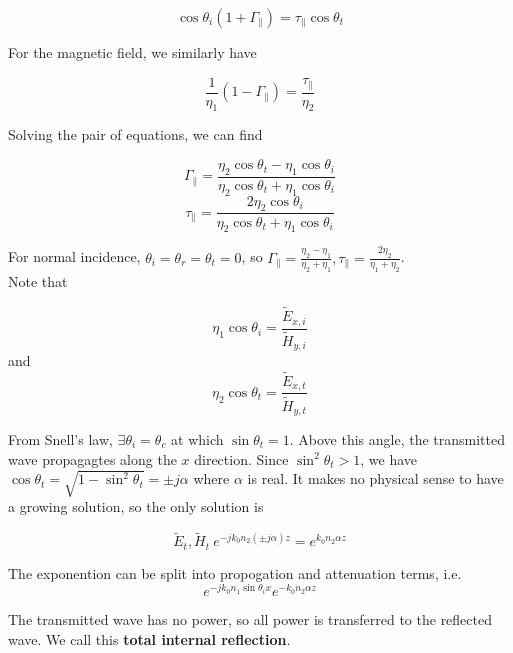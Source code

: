 \documentclass[12pt]{article}
\begin{document}
$$\cos\theta_i(1 + \Gamma_\parallel) = \tau_\parallel \cos\theta_t$$

For the magnetic field, we similarly have

$$\frac{1}{\eta_1}(1 - \Gamma_\parallel) = \frac{\tau_\parallel}{\eta_2}$$

Solving the pair of equations, we can find

$$\Gamma_\parallel = \frac{\eta_2\cos\theta_t - \eta_1\cos\theta_i}{\eta_2\cos\theta_t + \eta_1\cos\theta_i}$$
$$\tau_\parallel = \frac{2\eta_2\cos\theta_i}{\eta_2\cos\theta_t + \eta_1\cos\theta_i}$$

For normal incidence, $\theta_i = \theta_r = \theta_t = 0$, so $\Gamma_\parallel = \frac{\eta_2 - \eta_1}{\eta_2 + \eta_1}, \tau_\parallel = \frac{2\eta_2}{\eta_1 + \eta_2}$. \\

Note that

$$\eta_1\cos\theta_i = \frac{\tilde E_{x,i}}{\tilde H_{y,i}}$$
and
$$\eta_2\cos\theta_t = \frac{\tilde E_{x,t}}{\tilde H_{y,t}}$$

From Snell's law, $\exists \theta_i = \theta_c$ at which $\sin\theta_t = 1$. Above this angle, the transmitted wave propagagtes along the $x$ direction. Since $\sin^2\theta_t > 1$, we have $\cos\theta_t = \sqrt{1 - \sin^2\theta_t} = \pm j\alpha$ where $\alpha$ is real. It makes no physical sense to have a growing solution, so the only solution is

$$\tilde E_t, \tilde H_t ~ e^{-jk_0n_2(\pm j\alpha)z} = e^{k_0n_2\alpha z}$$

The exponention can be split into propogation and attenuation terms, i.e.
$$e^{-jk_0n_1\sin\theta_ix}e^{-k_0n_2\alpha z}$$

The transmitted wave has no power, so all power is transferred to the reflected wave. We call this \textbf{total internal reflection}.
\end{document}
